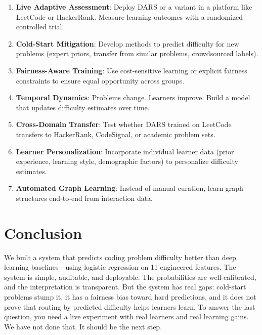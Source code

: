 \documentclass[conference]{IEEEtran}
\begin{document}
\begin{enumerate}
    \item \textbf{Live Adaptive Assessment}: Deploy DARS or a variant in a platform like LeetCode or HackerRank. Measure learning outcomes with a randomized controlled trial.
    
    \item \textbf{Cold-Start Mitigation}: Develop methods to predict difficulty for new problems (expert priors, transfer from similar problems, crowdsourced labels).
    
    \item \textbf{Fairness-Aware Training}: Use cost-sensitive learning or explicit fairness constraints to ensure equal opportunity across groups.
    
    \item \textbf{Temporal Dynamics}: Problems change. Learners improve. Build a model that updates difficulty estimates over time.
    
    \item \textbf{Cross-Domain Transfer}: Test whether DARS trained on LeetCode transfers to HackerRank, CodeSignal, or academic problem sets.
    
    \item \textbf{Learner Personalization}: Incorporate individual learner data (prior experience, learning style, demographic factors) to personalize difficulty estimates.
    
    \item \textbf{Automated Graph Learning}: Instead of manual curation, learn graph structures end-to-end from interaction data.
\end{enumerate}

\section{Conclusion}

We built a system that predicts coding problem difficulty better than deep learning baselines—using logistic regression on 11 engineered features. The system is simple, auditable, and deployable. The probabilities are well-calibrated, and the interpretation is transparent. But the system has real gaps: cold-start problems stump it, it has a fairness bias toward hard predictions, and it does not prove that routing by predicted difficulty helps learners learn. To answer the last question, you need a live experiment with real learners and real learning gains. We have not done that. It should be the next step.
\end{document}
